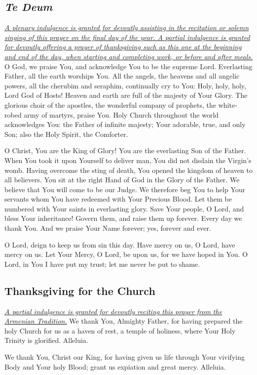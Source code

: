 \documentclass[12pt]{article}
\newcommand{\prayertitle}[1]{\subsection{#1}}
\newcommand{\indulgencedprayertitle}[1]{\prayertitle{#1 \protect\kreuz}}
\newcommand{\emphasis}[1]{\emph{#1}}
\newcommand{\emphasis}[1]{\textsl{#1}}
\newcommand{\foreign}[1]{\emphasis{#1}}
\newcommand{\note}[1]{{\small{\emphasis{#1}}}\newline}
\newcommand{\linkednote}[2]{\hyperlink{#1}{\note{#2}}}
\begin{document}
\indulgencedprayertitle{\foreign{Te Deum}}
\linkednote{grant26}{A plenary indulgence is granted for devoutly assisting in the recitation or solemn singing of this prayer on the final day of the year.
A partial indulgence is granted for devoutly offering a prayer of thanksgiving such as this one at the beginning and end of the day, when starting and completing work, or before and after meals.}
O God, we praise You, and acknowledge You to be the supreme Lord.
Everlasting Father, all the earth worships You.
All the angels, the heavens and all angelic powers, all the cherubim and seraphim, continually cry to You:
Holy, holy, holy, Lord God of Hosts!
Heaven and earth are full of the majesty of Your Glory.
The glorious choir of the apostles, the wonderful company of prophets, the white-robed army of martyrs, praise You.
Holy Church throughout the world acknowledges You:
the Father of infinite majesty;
Your adorable, true, and only Son;
also the Holy Spirit, the Comforter.

O Christ, You are the King of Glory!
You are the everlasting Son of the Father.
When You took it upon Yourself to deliver man, You did not disdain the Virgin's womb.
Having overcome the sting of death, You opened the kingdom of heaven to all believers.
You sit at the right Hand of God in the Glory of the Father.
We believe that You will come to be our Judge.
We therefore beg You to help Your servants whom You have redeemed with Your Precious Blood.
Let them be numbered with Your saints in everlasting glory.
Save Your people, O Lord, and bless Your inheritance!
Govern them, and raise them up forever.
Every day we thank You.
And we praise Your Name forever;
yes, forever and ever.

O Lord, deign to keep us from sin this day.
Have mercy on us, O Lord, have mercy on us.
Let Your Mercy, O Lord, be upon us, for we have hoped in You.
O Lord, in You I have put my trust;
let me never be put to shame.

\indulgencedprayertitle{Thanksgiving for the Church}
\linkednote{grant23}{A partial indulgence is granted for devoutly reciting this prayer from the Armenian Tradition.}
We thank You, Almighty Father, for having prepared the holy Church for us as a haven
of rest, a temple of holiness, where Your Holy Trinity is glorified. Alleluia.

We thank You, Christ our King, for having given us life through Your vivifying Body
and Your holy Blood; grant us expiation and great mercy. Alleluia.
\end{document}

